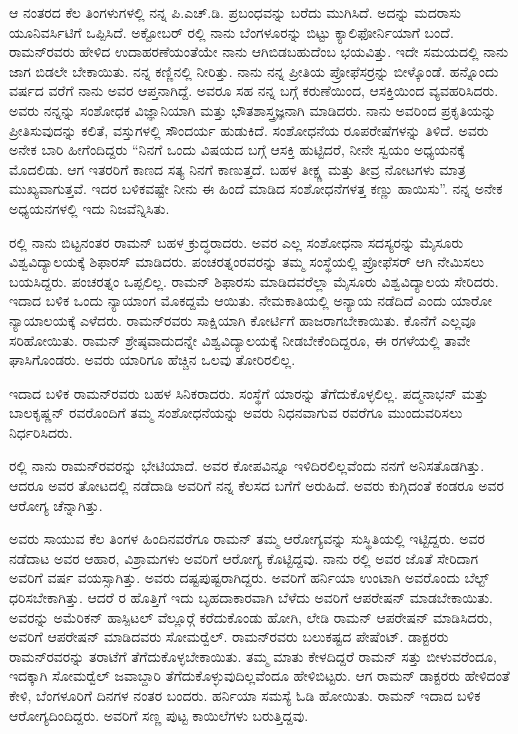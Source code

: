 ಆ ನಂತರದ ಕೆಲ ತಿಂಗಳುಗಳಲ್ಲಿ ನನ್ನ ಪಿ.ಎಚ್.ಡಿ. ಪ್ರಬಂಧವನ್ನು ಬರೆದು ಮುಗಿಸಿದೆ. ಅದನ್ನು ಮದರಾಸು ಯೂನಿವರ್ಸಿಟಿಗೆ ಒಪ್ಪಿಸಿದೆ. ಅಕ್ಟೋಬರ್ ರಲ್ಲಿ ನಾನು ಬೆಂಗಳೂರನ್ನು ಬಿಟ್ಟು ಕ್ಯಾಲಿಫೋರ್ನಿಯಾಗೆ ಬಂದೆ. ರಾಮನ್‍ರವರು ಹೇಳಿದ ಉದಾಹರಣೆಯಂತೆಯೇ ನಾನು ಆಗಿಬಿಡಬಹುದೆಂಬ ಭಯವಿತ್ತು. ಇದೇ ಸಮಯದಲ್ಲಿ ನಾನು ಜಾಗ ಬಿಡಲೇ ಬೇಕಾಯಿತು. ನನ್ನ ಕಣ್ಣಿನಲ್ಲಿ ನೀರಿತ್ತು. ನಾನು ನನ್ನ ಪ್ರೀತಿಯ ಪ್ರೋಫೆಸರ್‍ರನ್ನು ಬೀಳ್ಕೊಂಡೆ. ಹನ್ನೊಂದು ವರ್ಷದ ವರೆಗೆ ನಾನು ಅವರ ಆಪ್ತನಾಗಿದ್ದೆ. ಅವರೂ ಸಹ ನನ್ನ ಬಗ್ಗೆ ಕರುಣೆಯಿಂದ, ಆಸಕ್ತಿಯಿಂದ ವ್ಯವಹರಿಸಿದರು. ಅವರು ನನ್ನನ್ನು ಸಂಶೋಧಕ ವಿಜ್ಞಾನಿಯಾಗಿ ಮತ್ತು ಭೌತಶಾಸ್ತ್ರಜ್ಞನಾಗಿ ಮಾಡಿದರು. ನಾನು ಅವರಿಂದ ಪ್ರಕೃತಿಯನ್ನು ಪ್ರೀತಿಸುವುದನ್ನು ಕಲಿತೆ, ವಸ್ತುಗಳಲ್ಲಿ ಸೌಂದರ್ಯ ಹುಡುಕಿದೆ. ಸಂಶೋಧನೆಯ ರೂಪರೇಷೆಗಳನ್ನು ತಿಳಿದೆ. ಅವರು ಅನೇಕ ಬಾರಿ ಹೀಗೆಂದಿದ್ದರು \enginline{-} “ನಿನಗೆ ಒಂದು ವಿಷಯದ ಬಗ್ಗೆ ಆಸಕ್ತಿ ಹುಟ್ಟಿದರೆ, ನೀನೇ ಸ್ವಯಂ ಅಧ್ಯಯನಕ್ಕೆ ಮೊದಲಿಡು. ಆಗ ಇತರರಿಗೆ ಕಾಣದ ಸತ್ಯ ನಿನಗೆ ಕಾಣುತ್ತದೆ. ಬಹಳ ತೀಕ್ಷ್ಣ ಮತ್ತು ತೀವ್ರ ನೋಟಗಳು ಮಾತ್ರ ಮುಖ್ಯವಾಗುತ್ತವೆ. ಇದರ ಬಳಿಕವಷ್ಟೇ ನೀನು ಈ ಹಿಂದೆ ಮಾಡಿದ ಸಂಶೋಧನೆಗಳತ್ತ ಕಣ್ಣು ಹಾಯಿಸು”. ನನ್ನ ಅನೇಕ ಅಧ್ಯಯನಗಳಲ್ಲಿ ಇದು ನಿಜವೆನ್ನಿಸಿತು.

ರಲ್ಲಿ ನಾನು ಬಿಟ್ಟನಂತರ ರಾಮನ್ ಬಹಳ ಕ್ರುದ್ಧರಾದರು. ಅವರ ಎಲ್ಲ ಸಂಶೋಧನಾ ಸದಸ್ಯರನ್ನು ಮೈಸೂರು ವಿಶ್ವವಿದ್ಯಾಲಯಕ್ಕೆ ಶಿಫಾರಸ್ ಮಾಡಿದರು. ಪಂಚರತ್ನಂರವರನ್ನು ತಮ್ಮ ಸಂಸ್ಥೆಯಲ್ಲಿ ಪ್ರೋಫೆಸರ್ ಆಗಿ ನೇಮಿಸಲು ಬಯಸಿದ್ದರು. ಪಂಚರತ್ನಂ ಒಪ್ಪಲಿಲ್ಲ. ರಾಮನ್ ಶಿಫಾರಸು ಮಾಡಿದವರೆಲ್ಲಾ ಮೈಸೂರು ವಿಶ್ವವಿದ್ಯಾಲಯ ಸೇರಿದರು. ಇದಾದ ಬಳಿಕ ಒಂದು ನ್ಯಾಯಾಂಗ ಮೊಕದ್ದಮೆ ಆಯಿತು. ನೇಮಕಾತಿಯಲ್ಲಿ ಅನ್ಯಾಯ ನಡೆದಿದೆ ಎಂದು ಯಾರೋ ನ್ಯಾಯಾಲಯಕ್ಕೆ ಎಳೆದರು. ರಾಮನ್‍ರವರು ಸಾಕ್ಷಿಯಾಗಿ ಕೋರ್ಟಿಗೆ ಹಾಜರಾಗಬೇಕಾಯಿತು. ಕೊನೆಗೆ ಎಲ್ಲವೂ ಸರಿಹೋಯಿತು. ರಾಮನ್ ಶ್ರೇಷ್ಠವಾದುದನ್ನೇ ವಿಶ್ವವಿದ್ಯಾಲಯಕ್ಕೆ ನೀಡಬೇಕೆಂದಿದ್ದರೂ, ಈ ರಗಳೆಯಲ್ಲಿ ತಾವೇ ಘಾಸಿಗೊಂಡರು. ಅವರು ಯಾರಿಗೂ ಹೆಚ್ಚಿನ ಒಲವು ತೋರಿರಲಿಲ್ಲ.

ಇದಾದ ಬಳಿಕ ರಾಮನ್‍ರವರು ಬಹಳ ಸಿನಿಕರಾದರು. ಸಂಸ್ಥೆಗೆ ಯಾರನ್ನು ತೆಗೆದುಕೊಳ್ಳಲಿಲ್ಲ. ಪದ್ಮನಾಭನ್ ಮತ್ತು ಬಾಲಕೃಷ್ಣನ್ ರವರೊಂದಿಗೆ ತಮ್ಮ ಸಂಶೋಧನೆಯನ್ನು ಅವರು ನಿಧನವಾಗುವ  ರವರೆಗೂ ಮುಂದುವರಿಸಲು ನಿರ್ಧರಿಸಿದರು.

ರಲ್ಲಿ ನಾನು ರಾಮನ್‍ರವರನ್ನು ಭೇಟಿಯಾದೆ. ಅವರ ಕೋಪವಿನ್ನೂ ಇಳಿದಿರಲಿಲ್ಲವೆಂದು ನನಗೆ ಅನಿಸತೊಡಗಿತ್ತು. ಆದರೂ ಅವರ ತೋಟದಲ್ಲಿ ನಡೆದಾಡಿ ಅವರಿಗೆ ನನ್ನ ಕೆಲಸದ ಬಗೆಗೆ ಅರುಹಿದೆ. ಅವರು ಕುಗ್ಗಿದಂತೆ ಕಂಡರೂ ಅವರ ಆರೋಗ್ಯ ಚೆನ್ನಾಗಿತ್ತು.

ಅವರು ಸಾಯುವ ಕೆಲ ತಿಂಗಳ ಹಿಂದಿನವರೆಗೂ ರಾಮನ್ ತಮ್ಮ ಆರೋಗ್ಯವನ್ನು ಸುಸ್ಥಿತಿಯಲ್ಲಿ ಇಟ್ಟಿದ್ದರು. ಅವರ ನಡೆದಾಟ ಅವರ ಆಹಾರ, ವಿಶ್ರಾಮಗಳು ಅವರಿಗೆ ಆರೋಗ್ಯ ಕೊಟ್ಟಿದ್ದವು. ನಾನು ರಲ್ಲಿ ಅವರ ಜೊತೆ ಸೇರಿದಾಗ ಅವರಿಗೆ  ವರ್ಷ ವಯಸ್ಸಾಗಿತ್ತು. ಅವರು ದಷ್ಟಪುಷ್ಟರಾಗಿದ್ದರು. ಅವರಿಗೆ ಹರ್ನಿಯಾ ಉಂಟಾಗಿ ಅವರೊಂದು ಬೆಲ್ಟ್ ಧರಿಸಬೇಕಾಗಿತ್ತು. ಆದರೆ ರ ಹೊತ್ತಿಗೆ ಇದು ಬೃಹದಾಕಾರವಾಗಿ ಬೆಳೆದು ಅವರಿಗೆ ಆಪರೇಷನ್ ಮಾಡಬೇಕಾಯಿತು. ಅವರನ್ನು ಅಮೆರಿಕನ್ ಹಾಸ್ಪಿಟಲ್ ವೆಲ್ಲೂರ್‍ಗೆ ಕರೆದುಕೊಂಡು ಹೋಗಿ, ಲೇಡಿ ರಾಮನ್ ಆಪರೇಷನ್ ಮಾಡಿಸಿದರು, ಅವರಿಗೆ ಆಪರೇಷನ್ ಮಾಡಿದವರು ಸೋಮರ್‍ವೆಲ್. ರಾಮನ್‍ರವರು ಬಲುಕಷ್ಟದ ಪೇಷೆಂಟ್. ಡಾಕ್ಟರರು ರಾಮನ್‍ರವರನ್ನು ತರಾಟೆಗೆ ತೆಗೆದುಕೊಳ್ಳಬೇಕಾಯಿತು. ತಮ್ಮ ಮಾತು ಕೇಳದಿದ್ದರೆ ರಾಮನ್ ಸತ್ತು ಬೀಳುವರೆಂದೂ, ಇದಕ್ಕಾಗಿ ಸೋಮರ್‍ವೆಲ್ ಜವಾಬ್ದಾರಿ ತೆಗೆದುಕೊಳ್ಳುವುದಿಲ್ಲವೆಂದೂ ಹೇಳಿಬಿಟ್ಟರು. ಆಗ ರಾಮನ್ ಡಾಕ್ಟರರು ಹೇಳಿದಂತೆ ಕೇಳಿ, ಬೆಂಗಳೂರಿಗೆ  ದಿನಗಳ ನಂತರ ಬಂದರು. ಹರ್ನಿಯಾ ಸಮಸ್ಯೆ ಓಡಿ ಹೋಯಿತು. ರಾಮನ್ ಇದಾದ ಬಳಿಕ ಆರೋಗ್ಯದಿಂದಿದ್ದರು. ಅವರಿಗೆ ಸಣ್ಣ ಪುಟ್ಟ ಕಾಯಿಲೆಗಳು ಬರುತ್ತಿದ್ದವು.

